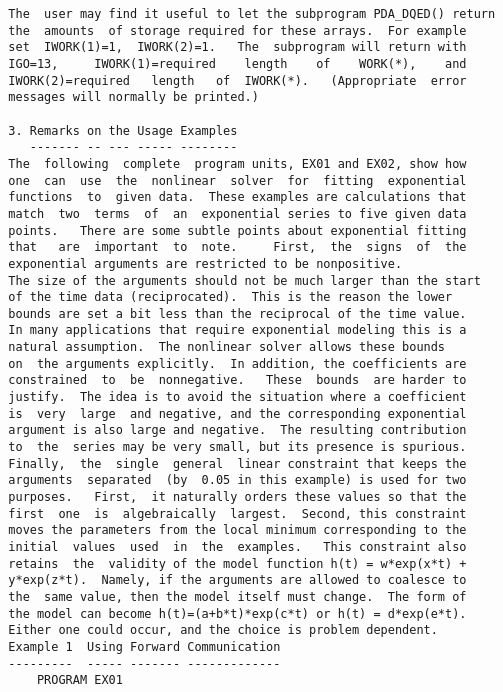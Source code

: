 \begin{verbatim}
  The  user may find it useful to let the subprogram PDA_DQED() return
  the  amounts  of storage required for these arrays.  For example
  set  IWORK(1)=1,  IWORK(2)=1.   The  subprogram will return with
  IGO=13,     IWORK(1)=required    length    of    WORK(*),    and
  IWORK(2)=required   length   of  IWORK(*).   (Appropriate  error
  messages will normally be printed.)

  3. Remarks on the Usage Examples
     ------- -- --- ----- --------
  The  following  complete  program units, EX01 and EX02, show how
  one  can  use  the  nonlinear  solver  for  fitting  exponential
  functions  to  given data.  These examples are calculations that
  match  two  terms  of  an  exponential series to five given data
  points.   There are some subtle points about exponential fitting
  that   are  important  to  note.     First,  the  signs  of  the
  exponential arguments are restricted to be nonpositive.
  The size of the arguments should not be much larger than the start
  of the time data (reciprocated).  This is the reason the lower
  bounds are set a bit less than the reciprocal of the time value.
  In many applications that require exponential modeling this is a
  natural assumption.  The nonlinear solver allows these bounds
  on  the arguments explicitly.  In addition, the coefficients are
  constrained  to  be  nonnegative.   These  bounds  are harder to
  justify.  The idea is to avoid the situation where a coefficient
  is  very  large  and negative, and the corresponding exponential
  argument is also large and negative.  The resulting contribution
  to  the  series may be very small, but its presence is spurious.
  Finally,  the  single  general  linear constraint that keeps the
  arguments  separated  (by  0.05 in this example) is used for two
  purposes.   First,  it naturally orders these values so that the
  first  one  is  algebraically  largest.  Second, this constraint
  moves the parameters from the local minimum corresponding to the
  initial  values  used  in  the  examples.   This constraint also
  retains  the  validity of the model function h(t) = w*exp(x*t) +
  y*exp(z*t).  Namely, if the arguments are allowed to coalesce to
  the  same value, then the model itself must change.  The form of
  the model can become h(t)=(a+b*t)*exp(c*t) or h(t) = d*exp(e*t).
  Either one could occur, and the choice is problem dependent.
  Example 1  Using Forward Communication
  ---------  ----- ------- -------------
      PROGRAM EX01


\end{verbatim}
